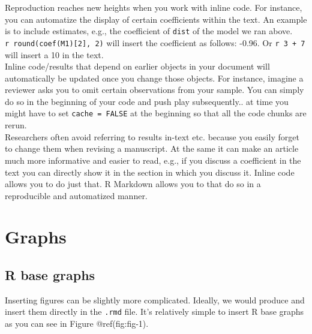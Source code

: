 \documentclass[
  letterpaper,
  DIV=11,
  numbers=noendperiod]{scrartcl}
\begin{document}
Reproduction reaches new heights when you work with inline code. For
instance, you can automatize the display of certain coefficients within
the text. An example is to include estimates, e.g., the coefficient of
\texttt{dist} of the model we ran above.
\texttt{\textasciigrave{}r\ round(coef(M1){[}2{]},\ 2)\textasciigrave{}}
will insert the coefficient as follows: -0.96. Or
\texttt{\textasciigrave{}r\ 3\ +\ 7\textasciigrave{}} will insert a 10
in the text.\\
Inline code/results that depend on earlier objects in your document will
automatically be updated once you change those objects. For instance,
imagine a reviewer asks you to omit certain observations from your
sample. You can simply do so in the beginning of your code and push play
subsequently.. at time you might have to set \texttt{cache\ =\ FALSE} at
the beginning so that all the code chunks are rerun.\\
Researchers often avoid referring to results in-text etc. because you
easily forget to change them when revising a manuscript. At the same it
can make an article much more informative and easier to read, e.g., if
you discuss a coefficient in the text you can directly show it in the
section in which you discuss it. Inline code allows you to do just that.
R Markdown allows you to that do so in a reproducible and automatized
manner.

\hypertarget{graphs}{%
\section{Graphs}\label{graphs}}

\hypertarget{r-base-graphs}{%
\subsection{R base graphs}\label{r-base-graphs}}

Inserting figures can be slightly more complicated. Ideally, we would
produce and insert them directly in the \texttt{.rmd} file. It's
relatively simple to insert R base graphs as you can see in Figure
@ref(fig:fig-1).
\end{document}
